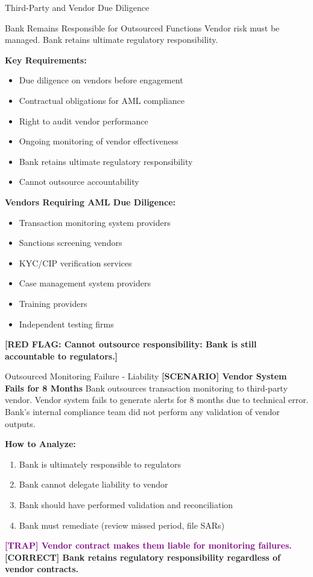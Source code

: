 \documentclass[11pt,a4paper]{beamer}
\newcommand{\trap}[1]{\textcolor{purple}{\textbf{[TRAP] #1}}}
\newcommand{\correct}[1]{\textcolor{green!50!black}{\textbf{[CORRECT] #1}}}
\newcommand{\scenario}[1]{\textcolor{blue!70!black}{\textbf{[SCENARIO] #1}}}
\newcommand{\redflag}[1]{\textcolor{red!80!black}{\textbf{[RED FLAG: #1]}}}
\begin{document}
	\begin{frame}{Third-Party and Vendor Due Diligence}
		\begin{block}{Bank Remains Responsible for Outsourced Functions}
			Vendor risk must be managed. Bank retains ultimate regulatory responsibility.
		\end{block}
		\textbf{Key Requirements:}
		\begin{itemize}
			\item Due diligence on vendors before engagement
			\item Contractual obligations for AML compliance
			\item Right to audit vendor performance
			\item Ongoing monitoring of vendor effectiveness
			\item Bank retains ultimate regulatory responsibility
			\item Cannot outsource accountability
		\end{itemize}
		\textbf{Vendors Requiring AML Due Diligence:}
		\begin{itemize}
			\item Transaction monitoring system providers
			\item Sanctions screening vendors
			\item KYC/CIP verification services
			\item Case management system providers
			\item Training providers
			\item Independent testing firms
		\end{itemize}
		\redflag{Cannot outsource responsibility: Bank is still accountable to regulators.}
	\end{frame}
	
	\begin{frame}{Outsourced Monitoring Failure - Liability}
		\scenario{Vendor System Fails for 8 Months}
		Bank outsources transaction monitoring to third-party vendor. Vendor system fails to generate alerts for 8 months due to technical error. Bank's internal compliance team did not perform any validation of vendor outputs.
		
		\vspace{0.1cm}
		\textbf{How to Analyze:}
		\begin{enumerate}
			\item Bank is ultimately responsible to regulators
			\item Bank cannot delegate liability to vendor
			\item Bank should have performed validation and reconciliation
			\item Bank must remediate (review missed period, file SARs)
		\end{enumerate}
		\trap{Vendor contract makes them liable for monitoring failures.}
		\correct{Bank retains regulatory responsibility regardless of vendor contracts.}
	\end{frame}
	
\end{document}

